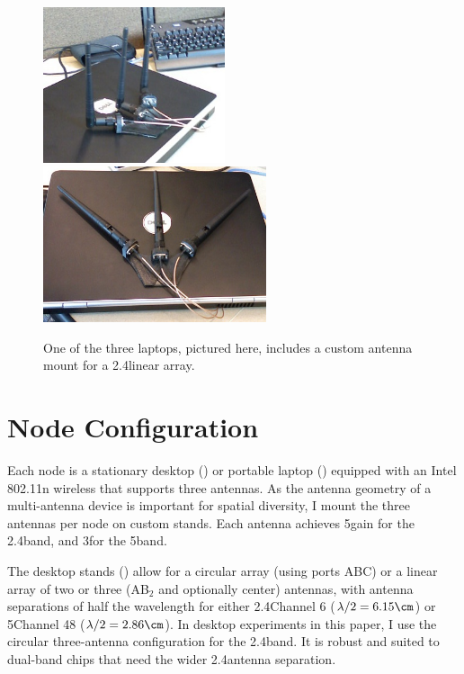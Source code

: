 \begin{figure}[ht]
	\centering
	\includegraphics[height=1.8in]{figures/tool/laptop_stand_cropped_up.jpg}%
	\hspace{0.6in}%
	\includegraphics[height=1.8in]{figures/tool/laptop_stand_cropped.jpg}
	\caption[A custom laptop antenna stand]{\label{fig:laptop_stands}One of the three laptops, pictured here, includes a custom antenna mount for a 2.4\GHz linear array.}
\end{figure}

\section{Node Configuration}
Each node is a stationary desktop () or portable laptop () equipped with an Intel 802.11n wireless  that supports three antennas. As the antenna geometry of a multi-antenna device is important for spatial diversity, I mount the three antennas per node on custom stands. Each antenna achieves 5\dBi gain for the 2.4\GHz band, and 3\dBi for the 5\GHz band.

The desktop stands () allow for a circular array (using ports ABC) or a linear array of two or three (AB$_2$ and optionally center) antennas, with antenna separations of half the wavelength for either 2.4\GHz Channel 6 ($\lambda/2 = 6.15\cm$) or 5\GHz Channel 48 ($\lambda/2=2.86\cm$). In desktop experiments in this paper, I use the circular three-antenna configuration for the 2.4\GHz band. It is robust and suited to dual-band chips that need the wider 2.4\GHz antenna separation. 

